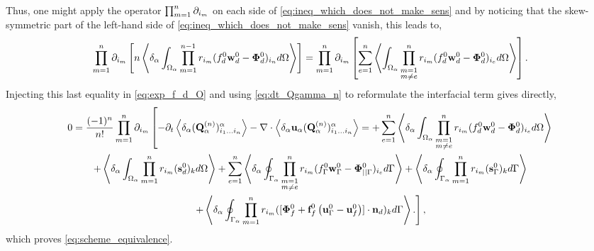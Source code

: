 Thus, one might apply the operator $\prod_{m=1}^{n} \partial_{i_m}$ on each side of \ref{eq:ineq_which_does_not_make_sens} and by noticing that the skew-symmetric part of the left-hand side of \ref{eq:ineq_which_does_not_make_sens} vanish, this leads to, 
\begin{equation*}
    \partialp{1}{n}\left[
        n\pavg{\int_{\Omega_\alpha} \pri{1}{n-1} ( f_d^0 \textbf{w}_d^0-\bm\Phi_d^0)_{i_n} d\Omega}
        \right]
    =
    \partialp{1}{n}\left[
    \sum_{e=1}^{n} 
    \avg{
        \intO{
        \prod^{n}_{\substack{ m=1 \\m \neq e}} r_{i_m} (f_d^0 \textbf{w}_d^0  - \bm\Phi_d^0)_{i_e}
        }
    }
    \right]. 
    \label{eq:it_make_sens_again}
\end{equation*}
Injecting this last equality in \ref{eq:exp_f_d_O} and using \ref{eq:dt_Qgamma_n} to reformulate the interfacial term gives directly, 
\begin{multline}
    0 = \frac{(-1)^n}{n!}
    \prod_{m=1}^{n} \partial_{i_m}
    \left[
        - \partial_t \left<\delta_\alpha (\textbf{Q}_\alpha^{(n)})_{i_1\ldots i_n}^\alpha\right>
        - \mathbf{\nabla}\cdot  \left<\delta_\alpha \textbf{u}_\alpha (\textbf{Q}_\alpha^{(n)})_{i_1\ldots i_n}^\alpha\right>
        =+\sum_{e=1}^{n} 
        \left<\delta_\alpha \int_{\Omega_{\alpha}} 
            \prod^{n}_{\substack{ m=1 \\m \neq e}} r_{i_m} (f_d^0\textbf{w}_d^0  - \bm\Phi_d^0)_{i_e}
         d\Omega\right>\right.\\\left.
        + \left<\delta_\alpha \int_{\Omega_{\alpha}}  \prod_{m=1}^{n} r_{i_m} (\textbf{s}_d^0)_k  d\Omega\right>
        +     
        \sum_{e=1}^{n} 
        \left<\delta_\alpha \oint_{\Gamma_{\alpha}} 
            \prod^{n}_{\substack{ m=1 \\m \neq e}} r_{i_m} (f_\Gamma^0\textbf{w}_\Gamma^0 - \bm\Phi_{||\Gamma}^0)_{i_e}
         d\Gamma\right>
        + \left<\delta_\alpha \oint_{\Gamma_{\alpha}}  \prod_{m=1}^{n} r_{i_m} (\textbf{s}_\Gamma^0)_k  d\Gamma\right> \right.\\\left.
        +\left<\delta_\alpha \oint_{\Gamma_{\alpha}}  \prod_{m=1}^{n} r_{i_m} ([\bm\Phi_f^0 + \textbf{f}_f^0 \left(\textbf{u}_\Gamma^0 - \textbf{u}_f^0\right)]\cdot \textbf{n}_d)_k  d\Gamma\right>. 
    \right],
\end{multline}
which proves \ref{eq:scheme_equivalence}.